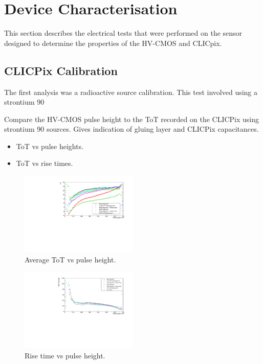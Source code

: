 \section{Device Characterisation}

This section describes the electrical tests that were performed on the sensor designed to determine the properties of the HV-CMOS and CLICpix.  

\subsection{CLICPix Calibration}
The first analysis was a radioactive source calibration.  This test involved using a strontium 90 

Compare the HV-CMOS pulse height to the ToT recorded on the CLICPix using strontium 90 sources.  Gives indication of gluing layer and CLICPix capacitances.  

\begin{itemize}
\item ToT vs pulse heights.  
\item ToT vs rise times.  
\end{itemize}

\begin{figure}
\centering
\includegraphics[width=0.5\textwidth]{CLICdpVertex/Plots/TargetToT_vs_PulseHeight.pdf}
\caption[Average ToT vs pulse height.]{Average ToT vs pulse height.}
\label{fig:avgtotvspulseheight}
\end{figure}

\begin{figure}
\centering
\includegraphics[width=0.5\textwidth]{CLICdpVertex/Plots/RiseTime_vs_PulseHeight.pdf}
\caption[Rise time vs pulse height.]{Rise time vs pulse height.}
\label{fig:risetimevspulseheight}
\end{figure}

